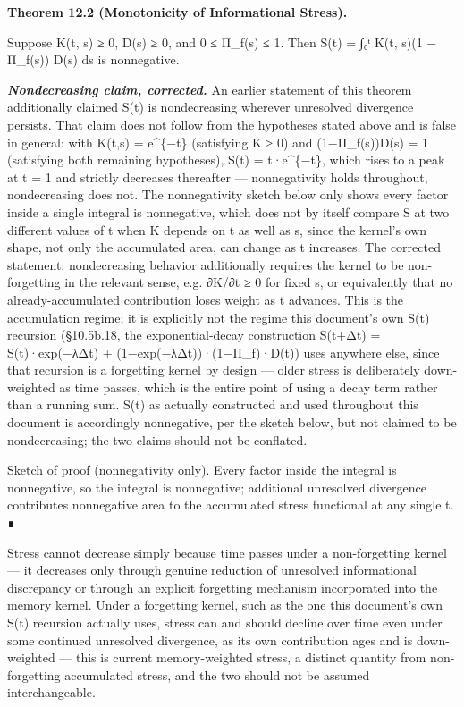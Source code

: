 \documentclass[
]{article}
\begin{document}
\textbf{Theorem 12.2 (Monotonicity of Informational Stress).}

Suppose K(t, s) ≥ 0, D(s) ≥ 0, and 0 ≤ Π\_f(s) ≤ 1. Then S(t) = ∫₀ᵗ K(t,
s)(1 − Π\_f(s)) D(s) ds is nonnegative.

\emph{\textbf{Nondecreasing claim, corrected.}} An earlier statement of
this theorem additionally claimed S(t) is nondecreasing wherever
unresolved divergence persists. That claim does not follow from the
hypotheses stated above and is false in general: with K(t,s) =
e\^{}\{−t\} (satisfying K ≥ 0) and (1−Π\_f(s))D(s) = 1 (satisfying both
remaining hypotheses), S(t) = t·e\^{}\{−t\}, which rises to a peak at t
= 1 and strictly decreases thereafter --- nonnegativity holds
throughout, nondecreasing does not. The nonnegativity sketch below only
shows every factor inside a single integral is nonnegative, which does
not by itself compare S at two different values of t when K depends on t
as well as s, since the kernel's own shape, not only the accumulated
area, can change as t increases. The corrected statement: nondecreasing
behavior additionally requires the kernel to be non-forgetting in the
relevant sense, e.g. ∂K/∂t ≥ 0 for fixed s, or equivalently that no
already-accumulated contribution loses weight as t advances. This is the
accumulation regime; it is explicitly not the regime this document's own
S(t) recursion (§10.5b.18, the exponential-decay construction S(t+Δt) =
S(t)·exp(−λΔt) + (1−exp(−λΔt))·(1−Π\_f)·D(t)) uses anywhere else, since
that recursion is a forgetting kernel by design --- older stress is
deliberately down-weighted as time passes, which is the entire point of
using a decay term rather than a running sum. S(t) as actually
constructed and used throughout this document is accordingly
nonnegative, per the sketch below, but not claimed to be nondecreasing;
the two claims should not be conflated.

Sketch of proof (nonnegativity only). Every factor inside the integral
is nonnegative, so the integral is nonnegative; additional unresolved
divergence contributes nonnegative area to the accumulated stress
functional at any single t. ∎

Stress cannot decrease simply because time passes under a non-forgetting
kernel --- it decreases only through genuine reduction of unresolved
informational discrepancy or through an explicit forgetting mechanism
incorporated into the memory kernel. Under a forgetting kernel, such as
the one this document's own S(t) recursion actually uses, stress can and
should decline over time even under some continued unresolved
divergence, as its own contribution ages and is down-weighted --- this
is current memory-weighted stress, a distinct quantity from
non-forgetting accumulated stress, and the two should not be assumed
interchangeable.
\end{document}

